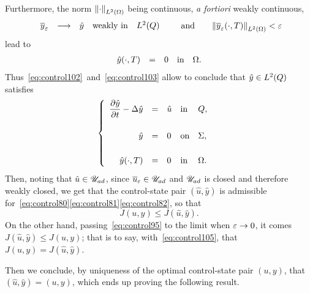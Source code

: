 Furthermore, the norm ${\left\|{\cdot }\right\|}_{L^{2}\left({\Omega}\right)}$ being continuous, \textit{a fortiori}
weakly continuous,
\begin{equation*}
    \begin{array}{rclll}
        {\overline{y}}_{\varepsilon} & \longrightarrow & \hat{y} & \text{weakly in} &
        L^{2}\!\left({Q}\right)
    \end{array}\qquad\text{and}\qquad
    {\left\|{ { {\overline{y}}_{\varepsilon} }\!\left({\cdot,T}\right)  }\right\|}_{L^{2}\left({\Omega}\right)} < \varepsilon
\end{equation*}
lead to
\begin{equation}\label{eq:control103}
    \begin{array}{rclll}
        {\hat{y}}\!\left({\cdot,T}\right) & = & 0 & \text{in} & \Omega.
    \end{array}
\end{equation}
Thus~\eqref{eq:control102}~and~\eqref{eq:control103} allow to conclude that
$\hat{y}\in L^{2}\!\left({Q}\right)$ satisfies
\begin{equation*}
    \begin{cases}\displaystyle
        \begin{array}{rclll}
            \dfrac{\partial{}\hat{y}}{\partial{}t} - \Delta\hat{y} & = & \hat{u} &
            \text{in} & Q,\\
            \\
            \hat{y} & = & 0 & \text{on} & \Sigma,\\
            \\
            {\hat{y}}\!\left({\cdot,T}\right) & = & 0 & \text{in} & \Omega.
        \end{array}
    \end{cases}
\end{equation*}
Then, noting that $\hat{u}\in{\mathscr{U}}_{ad}$, since ${\overline{u}}_{\varepsilon}\in{\mathscr{U}}_{ad}$ and ${\mathscr{U}}_{ad}$ is
closed and therefore weakly closed, we get that the control-state pair
$\left({\hat{u},\hat{y}}\right)$ is admissible
for~\eqref{eq:control80}\eqref{eq:control81}\eqref{eq:control82}, so that
\begin{equation}\label{eq:control105}
    J(u,y)\leq J\!\left({\hat{u},\hat{y}}\right).
\end{equation}
On the other hand, passing~\eqref{eq:control95} to the limit when $\varepsilon\to
0$, it comes $J\!\left({\hat{u},\hat{y}}\right)\leq J(u,y)$; that is to
say, with~\eqref{eq:control105}, that $J(u,y) =
J\!\left({\hat{u},\hat{y}}\right)$.

Then we conclude, by uniqueness of the optimal control-state pair $(u,y)$,
that $\left({\hat{u},\hat{y}}\right) = (u,y)$, which ends up proving the
following result.

